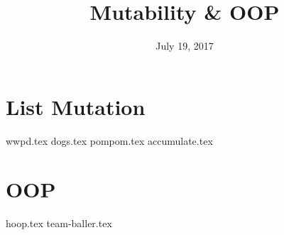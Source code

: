 \documentclass{exam}
\title{Mutability \& OOP}
\date{July 19, 2017}
\begin{document}
\maketitle

\section{List Mutation}
\begin{questions}
{wwpd.tex}
{dogs.tex}
{pompom.tex}
{accumulate.tex}
\end{questions}

\section{OOP}
\begin{questions}
{hoop.tex}
{team-baller.tex}
\end{questions}
\end{document}
